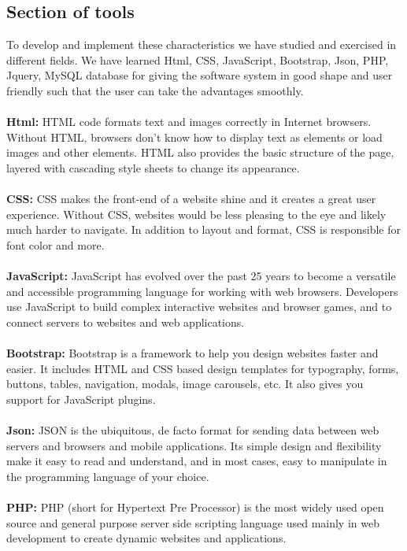\documentclass[14pt,a4paper,calibribody]{article}
\begin{document}
\subsection{Section of tools}
To develop and implement these characteristics we have studied and exercised in different fields. We have learned Html, CSS, JavaScript, Bootstrap, Json, PHP, Jquery, MySQL database for giving the software system in good shape and user friendly such that the user can take the advantages smoothly.\\\\
\textbf{Html:} HTML code formats text and images correctly in Internet browsers. Without HTML, browsers don't know how to display text as elements or load images and other elements. HTML also provides the basic structure of the page, layered with cascading style sheets to change its appearance.\\\\
\textbf{CSS:} CSS makes the front-end of a website shine and it creates a great user experience. Without CSS, websites would be less pleasing to the eye and likely much harder to navigate. In addition to layout and format, CSS is responsible for font color and more.\\\\
\textbf{JavaScript:} JavaScript has evolved over the past 25 years to become a versatile and accessible programming language for working with web browsers. Developers use JavaScript to build complex interactive websites and browser games, and to connect servers to websites and web applications.\\\\
\textbf{Bootstrap:} Bootstrap is a framework to help you design websites faster and easier. It includes HTML and CSS based design templates for typography, forms, buttons, tables, navigation, modals, image carousels, etc. It also gives you support for JavaScript plugins.\\\\
\textbf{Json:} JSON is the ubiquitous, de facto format for sending data between web servers and browsers and mobile applications. Its simple design and flexibility make it easy to read and understand, and in most cases, easy to manipulate in the programming language of your choice.\\\\
\textbf{PHP:} PHP (short for Hypertext Pre Processor) is the most widely used open source and general purpose server side scripting language used mainly in web development to create dynamic websites and applications.\\
\end{document}
